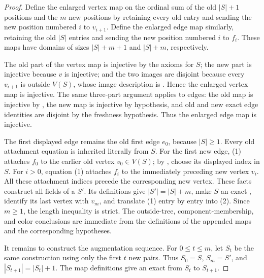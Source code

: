 \begin{proof}
Define the enlarged vertex map on the ordinal sum of the old
\(|S|+1\) positions and the \(m\) new positions by retaining every old
entry and sending the new position numbered \(i\) to \(v_{i+1}\).
Define the enlarged edge map similarly, retaining the old \(|S|\) entries
and sending the new position numbered \(i\) to \(f_i\).  These maps have
domains of sizes \(|S|+m+1\) and \(|S|+m\), respectively.

The old part of the vertex map is injective by the
 axioms for \(S\); the new part is injective because
\(v\) is injective; and the two images are disjoint because every
\(v_{i+1}\) is outside \(V(S)\), whose image description is
.  Hence the enlarged vertex map is
injective.  The same three-part argument applies to edges: the old map is
injective by , the new map is injective by hypothesis,
and old and new exact edge identities are disjoint by the freshness
hypothesis.  Thus the enlarged edge map is injective.

The first displayed edge remains the old first edge \(e_0\), because
\(|S|\geq1\).  Every old attachment equation is inherited literally from
\(S\).  For the first new edge, (1) attaches \(f_0\) to the earlier old
vertex \(v_0\in V(S)\); by , choose its
displayed index in \(S\).  For \(i>0\), equation (1) attaches \(f_i\) to
the immediately preceding new vertex \(v_i\).  All these attachment
indices precede the corresponding new vertex.  These facts construct all
fields of a  \(S'\).  Its definitions give
\(|S'|=|S|+m\), make \(S\) an exact
, identify its last vertex with
\(v_m\), and translate (1) entry by entry into (2).  Since \(m\geq1\),
the length inequality is strict.  The outside-tree, component-membership,
and color conclusions are immediate from the definitions of the appended
maps and the corresponding hypotheses.

It remains to construct the augmentation sequence.  For
\(0\leq t\leq m\), let \(S_t\) be the same construction using only the
first \(t\) new pairs.  Thus \(S_0=S\), \(S_m=S'\), and
\(|S_{t+1}|=|S_t|+1\).  The map definitions give an exact
 from \(S_t\) to \(S_{t+1}\).


\end{proof}
